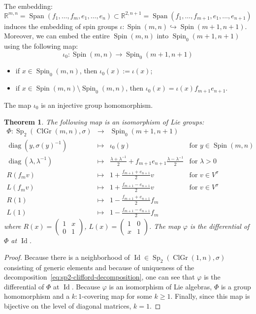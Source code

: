 \documentclass[a4paper,oneside,11pt]{amsart}
\DeclareMathOperator{\diag}{diag}
\DeclareMathOperator{\Id}{Id}
\DeclareMathOperator{\Span}{Span}
\DeclareMathOperator{\Sp}{Sp}
\DeclareMathOperator{\ClGr}{ClGr}
\DeclareMathOperator{\Spin}{Spin}
\newcommand{\R}{\mathbb R}
\theoremstyle{plain}
\newtheorem{teo}{Theorem}[section]
\theoremstyle{definition}
\theoremstyle{remark}
\newcommand{\bs}{\setminus}
\begin{document}
The embedding:
$$\R^{m,n}=\Span(f_1,\dots,f_m,e_1,\dots,e_n)\subset \R^{2,n+1}=\Span(f_1,\dots,f_{m+1},e_1,\dots,e_{n+1})$$
induces the embedding of spin groups $\iota \colon \Spin(m,n)\hookrightarrow\Spin(m+1,n+1)$. Moreover, we can embed the entire $\Spin(m,n)$ into $\Spin_0(m+1,n+1)$ using the following map:
$$\iota_0\colon\Spin(m,n)\to \Spin_0(m+1,n+1)$$
\begin{itemize}
\item if $x\in \Spin_0(m,n)$, then $\iota_0(x):=\iota(x)$;
\item if $x\in \Spin(m,n)\bs\Spin_0(m,n)$, then $\iota_0(x)=\iota(x)f_{m+1}e_{n+1}$.
\end{itemize}
The map $\iota_0$ is an injective group homomorphism.

\begin{teo}\label{Spin_as_Sp2}
The following map is an isomorphism of Lie groups:
$$\begin{array}{rcll}
\Phi\colon \Sp_2(\ClGr(m,n),\sigma) & \to & \Spin_0(m+1,n+1) & \\
 \diag(y,\sigma(y)^{-1}) & \mapsto & \iota_0(y) & \text{for }y\in\Spin(m,n)\\
 \diag(\lambda,\lambda^{-1}) & \mapsto & \frac{\lambda+\lambda^{-1}}{2}+f_{m+1}e_{n+1}\frac{\lambda-\lambda^{-1}}{2} & \text{for }\lambda>0\\
 R(f_mv) & \mapsto & 1+\frac{f_{m+1}+e_{n+1}}{2}v & \text{for }v\in V^\sigma \\
 L(f_mv) & \mapsto & 1+\frac{f_{m+1}-e_{n+1}}{2}v & \text{for }v\in V^\sigma\\
 R(1) & \mapsto & 1-\frac{f_{m+1}+e_{n+1}}{2}f_m\\
 L(1) & \mapsto & 1-\frac{f_{m+1}-e_{n+1}}{2}f_m
\end{array}$$
where $R(x)=\begin{pmatrix} 1 & x \\ 0 & 1 \end{pmatrix}$, $L(x)=\begin{pmatrix} 1 & 0 \\ x & 1 \end{pmatrix}$. The map $\varphi$ is the differential of $\Phi$ at $\Id$.
\end{teo}

\begin{proof} Because there is a neighborhood of $\Id\in \Sp_2(\ClGr(1,n),\sigma)$ consisting of generic elements and because of uniqueness of the decomposition~\eqref{eq:sp2-clifford-decomposition}, one can see that $\varphi$ is the differential of $\Phi$ at $\Id$. Because $\varphi$ is an isomorphism of Lie algebras, $\Phi$ is a group homomorphism and a $k:1$-covering map for some $k\geq 1$. Finally, since this map is bijective on the level of diagonal matrices, $k=1$. 
\end{proof}
\end{document}
